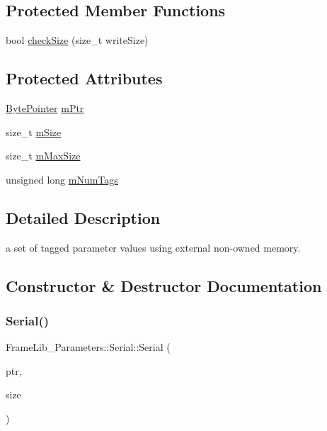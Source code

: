 \subsection*{Protected Member Functions}
\begin{DoxyCompactItemize}
\item 
bool \hyperlink{class_frame_lib___parameters_1_1_serial_a85681aac08fc30d99942fefee262a4ea}{check\+Size} (size\+\_\+t write\+Size)
\end{DoxyCompactItemize}
\subsection*{Protected Attributes}
\begin{DoxyCompactItemize}
\item 
\hyperlink{_frame_lib___types_8h_a2c5689a997a12479b7d925e565428141}{Byte\+Pointer} \hyperlink{class_frame_lib___parameters_1_1_serial_a28ea665fc997bfdef3947079505ece1f}{m\+Ptr}
\item 
size\+\_\+t \hyperlink{class_frame_lib___parameters_1_1_serial_a348d0da027db94981ccf75c939d46a98}{m\+Size}
\item 
size\+\_\+t \hyperlink{class_frame_lib___parameters_1_1_serial_abd8b4549cf121628d9f1f5ed518e6729}{m\+Max\+Size}
\item 
unsigned long \hyperlink{class_frame_lib___parameters_1_1_serial_a29965f9c21ae916dd31cf00aed5615e8}{m\+Num\+Tags}
\end{DoxyCompactItemize}


\subsection{Detailed Description}
a set of tagged parameter values using external non-\/owned memory. 

\subsection{Constructor \& Destructor Documentation}
\mbox{\label{class_frame_lib___parameters_1_1_serial_a240eb02a38ab2e545c088f63df9f1851}} 
\subsubsection{\texorpdfstring{Serial()}{Serial()}\hspace{0.1cm}{\footnotesize\ttfamily [1/3]}}
{\footnotesize\ttfamily Frame\+Lib\+\_\+\+Parameters\+::\+Serial\+::\+Serial (\begin{DoxyParamCaption}\item[{\hyperlink{_frame_lib___types_8h_a2c5689a997a12479b7d925e565428141}{Byte\+Pointer}}]{ptr,  }\item[{size\+\_\+t}]{size }\end{DoxyParamCaption})}

